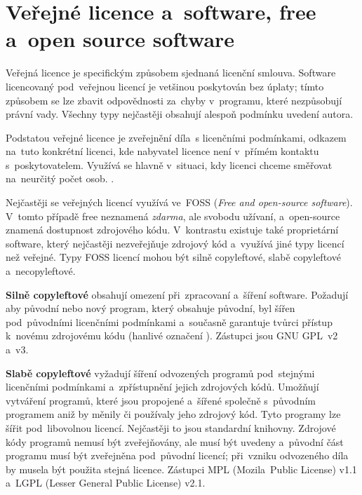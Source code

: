 \clearpage
\section{Veřejné licence a~software, free a~open source software}

Veřejná licence je specifickým způsobem sjednaná licenční smlouva. Software licencovaný pod~veřejnou licencí je vetšinou poskytován bez úplaty; tímto způsobem se lze zbavit odpovědnosti za~chyby v~programu, které nezpůsobují právní vady. Všechny typy nejčastěji obsahují alespoň podmínku uvedení autora.

Podstatou veřejné licence je zveřejnění díla~s licenčními podmínkami, odkazem na~tuto konkrétní licenci, kde nabyvatel licence není v~přímém kontaktu s~poskytovatelem. Využívá se hlavně v~situaci, kdy licenci chceme směřovat na~neurčitý počet osob. \emph{}.

Nejčastěji se veřejných licencí využívá ve~FOSS (\emph{Free and open-source software}). V~tomto případě free neznamená \emph{zdarma}, ale svobodu užívaní, a~open-source znamená dostupnost zdrojového kódu. V~kontrastu existuje také proprietární software, který nejčastěji nezveřejňuje zdrojový kód a~využívá jiné typy licencí než veřejné. Typy FOSS licencí mohou být silně copyleftové, slabě copyleftové a~necopyleftové.

\textbf{Silně copyleftové} obsahují omezení při~zpracovaní a~šíření software. Požadují aby původní nebo nový program, který obsahuje původní, byl šířen pod~původními licenčními podmínkami a~současně garantuje tvůrci přístup k~novému zdrojovému kódu (hanlivé označení ). Zástupci jsou GNU GPL~v2 a~v3.

\textbf{Slabě copyleftové} vyžadují šíření odvozených programů pod~stejnými licenčními podmínkami a~zpřístupnění jejich zdrojových kódů. Umožňují vytváření programů, které jsou propojené a~šířené společně s~původním programem aniž by měnily či používaly jeho zdrojový kód. Tyto programy lze šířit pod~libovolnou licencí. Nejčastěji to jsou standardní knihovny. Zdrojové kódy programů nemusí být zveřejňovány, ale musí být uvedeny a~původní část programu musí být zveřejněna pod~původní licencí; při~vzniku odvozeného díla by musela být použita stejná licence. Zástupci MPL (Mozila~Public License) v1.1 a~LGPL (Lesser General Public License) v2.1.

